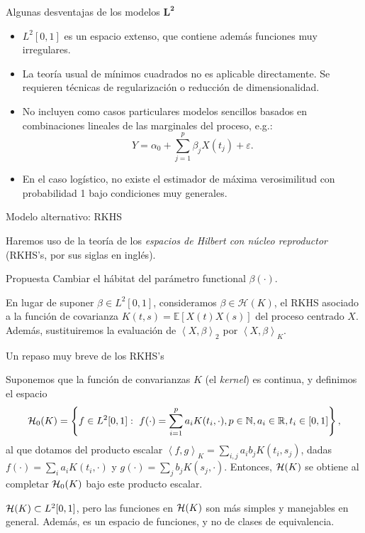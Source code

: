 \documentclass[10pt, spanish, professionalfonts]{beamer}
\newcommand\maroon[1]{\color{mLightBrown}#1\color{black}}
\newcommand{\N}{\mathbb{N}}
\newcommand{\R}{\mathbb{R}}
\newcommand{\Hcal}{\ensuremath\mathcal{H}}
\newcommand\dotprod[2]{\left\langle #1, #2 \right\rangle}
\begin{document}
\begin{frame}{Algunas desventajas de los modelos \(\bm{L^2}\)}
  \begin{itemize}
    \item \(L^2[0, 1]\) es un espacio extenso, que contiene además funciones muy irregulares.
    \item La teoría usual de mínimos cuadrados no es aplicable directamente. Se requieren técnicas de regularización o reducción de dimensionalidad.
    \item No incluyen como casos particulares modelos sencillos basados en combinaciones lineales de las marginales del proceso, e.g.:
    \[
      Y = \alpha_0 + \sum_{j=1}^p \beta_j X(t_j) + \varepsilon.
    \]
    \item En el caso logístico, no existe el estimador de máxima verosimilitud con probabilidad 1 bajo condiciones muy generales.
  \end{itemize}
\end{frame}


\begin{frame}{Modelo alternativo: RKHS}

Haremos uso de la teoría de los \textit{espacios de Hilbert con núcleo reproductor} (RKHS's, por sus siglas en inglés).

\begin{alertblock}{Propuesta}
  Cambiar el hábitat del parámetro functional \(\beta(\cdot)\).
\end{alertblock}

  En lugar de suponer \(\beta \in L^2[0, 1]\), consideramos \maroon{\(\beta \in \mathcal H(K)\)}, el RKHS asociado a la función de covarianza \(K(t, s)=\mathbb E[X(t)X(s)]\) del proceso centrado \(X\). Además, sustituiremos la evaluación de \(\dotprod{X}{\beta}_2\) por \maroon{\(\dotprod{X}{\beta}_K\)}.
\end{frame}


\begin{frame}{Un repaso muy breve de los RKHS's}
  \begin{definition}
    Suponemos que la función de convarianzas \(K\) (el \textit{kernel}) es continua, y definimos el espacio
    \[
    \Hcal_0(K) = \left\{ f \in L^2[0,1]: \ f(\cdot) = \sum_{i=1}^p a_i K(t_i, \cdot),  p \in \N,  a_i \in \R,  t_i \in [0, 1] \right\},
    \]
    al que dotamos del producto escalar \(\dotprod{f}{g}_K = \sum_{i, j} a_i b_j K(t_i, s_j)\), dadas \(f(\cdot)=\sum_i a_i K(t_i, \cdot) \) y \(g(\cdot)=\sum_j b_j K(s_j, \cdot)\). Entonces, \(\Hcal(K)\) se obtiene al completar \(\Hcal_0(K)\) bajo este producto escalar.
  \end{definition}

  \(\Hcal(K)\subset L^2[0, 1]\), pero las funciones en \(\Hcal(K)\) son más simples y manejables en general. Además, es un espacio de \maroon{funciones}, y no de clases de equivalencia.
\end{frame}
\end{document}

